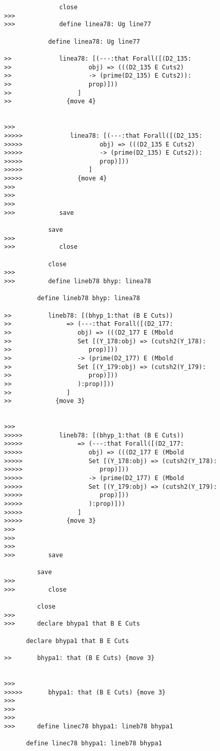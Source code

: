 \documentclass[12pt]{article}
\begin{document}
\begin{verbatim}
               close
>>>
>>>            define linea78: Ug line77

            define linea78: Ug line77

>>             linea78: [(---:that Forall([(D2_135:
>>                     obj) => (((D2_135 E Cuts2)
>>                     -> (prime(D2_135) E Cuts2)):
>>                     prop)]))
>>                  ]
>>               {move 4}


>>>
>>>>>             linea78: [(---:that Forall([(D2_135:
>>>>>                     obj) => (((D2_135 E Cuts2)
>>>>>                     -> (prime(D2_135) E Cuts2)):
>>>>>                     prop)]))
>>>>>                  ]
>>>>>               {move 4}
>>>
>>>
>>>
>>>            save

            save
>>>
>>>            close

            close
>>>
>>>         define lineb78 bhyp: linea78

         define lineb78 bhyp: linea78

>>          lineb78: [(bhyp_1:that (B E Cuts))
>>               => (---:that Forall([(D2_177:
>>                  obj) => (((D2_177 E (Mbold
>>                  Set [(Y_178:obj) => (cutsh2(Y_178):
>>                     prop)]))
>>                  -> (prime(D2_177) E (Mbold
>>                  Set [(Y_179:obj) => (cutsh2(Y_179):
>>                     prop)]))
>>                  ):prop)]))
>>               ]
>>            {move 3}


>>>
>>>>>          lineb78: [(bhyp_1:that (B E Cuts))
>>>>>               => (---:that Forall([(D2_177:
>>>>>                  obj) => (((D2_177 E (Mbold
>>>>>                  Set [(Y_178:obj) => (cutsh2(Y_178):
>>>>>                     prop)]))
>>>>>                  -> (prime(D2_177) E (Mbold
>>>>>                  Set [(Y_179:obj) => (cutsh2(Y_179):
>>>>>                     prop)]))
>>>>>                  ):prop)]))
>>>>>               ]
>>>>>            {move 3}
>>>
>>>
>>>
>>>         save

         save
>>>
>>>         close

         close
>>>
>>>      declare bhypa1 that B E Cuts

      declare bhypa1 that B E Cuts

>>       bhypa1: that (B E Cuts) {move 3}


>>>
>>>>>       bhypa1: that (B E Cuts) {move 3}
>>>
>>>
>>>
>>>      define linec78 bhypa1: lineb78 bhypa1

      define linec78 bhypa1: lineb78 bhypa1



\end{verbatim}
\end{document}
